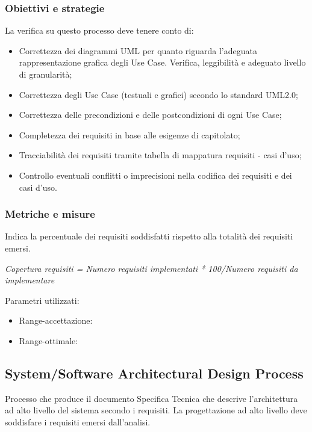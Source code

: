 \documentclass[a4paper,11pt]{article}
\begin{document}
\subsubsection{Obiettivi e strategie}
La verifica su questo processo deve tenere conto di:
\begin{itemize}
\item Correttezza dei diagrammi UML per quanto riguarda l'adeguata rappresentazione grafica degli Use Case. Verifica, leggibilità e adeguato livello di granularità;
\item Correttezza degli Use Case (testuali e grafici) secondo lo standard UML2.0;
\item Correttezza delle precondizioni e delle postcondizioni di ogni Use Case;
\item Completezza dei requisiti in base alle esigenze di capitolato;
\item Tracciabilità dei requisiti tramite tabella di mappatura requisiti - casi d'uso;
\item Controllo eventuali conflitti o imprecisioni nella codifica dei requisiti e dei casi d'uso.
\end{itemize}
\subsubsection{Metriche e misure}
Indica la percentuale dei requisiti soddisfatti rispetto alla totalità dei requisiti emersi.  
\begin{center}
\textit{Copertura requisiti = Numero requisiti implementati * 100/Numero requisiti da implementare}
\end{center}
Parametri utilizzati: 
\begin{itemize}
	\item Range-accettazione: \begin{math}[80 - 100]\end{math}
\item Range-ottimale: \begin{math}[90 - 100]\end{math}
	\end{itemize}
	
\subsection{System/Software Architectural Design Process}
Processo che produce il documento Specifica Tecnica che descrive l'architettura ad alto livello del sistema secondo i requisiti. La progettazione ad alto livello deve soddisfare i requisiti emersi dall'analisi. 
\end{document}
